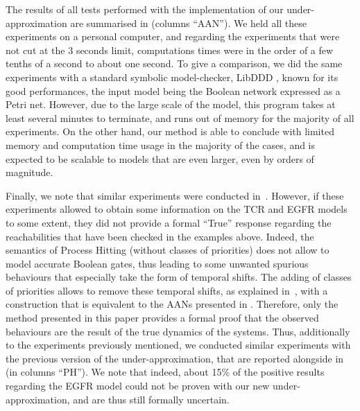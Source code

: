 The results of all tests performed with the implementation of our under-approximation
are summarised in  (columns “AAN”).
We held all these experiments on a personal computer,
and regarding the experiments that were not cut at the 3 seconds limit,
computations times were in the order of a few tenths of a second to about one second.
To give a comparison, we did the same experiments with a standard symbolic model-checker, LibDDD
\cite{libddd}, known for its good performances, the input model being the Boolean network expressed
as a Petri net.
However, due to the large scale of the model,
this program takes at least several minutes to terminate,
and runs out of memory for the majority of all experiments.
On the other hand,
our method is able to conclude with limited memory and computation time usage
in the majority of the cases,
and is expected to be scalable to models that are even larger,
even by orders of magnitude.

Finally, we note that similar experiments were conducted in~\cite{PMR12-MSCS}.
However, if these experiments allowed to obtain some information
on the TCR and EGFR models to some extent,
they did not provide a formal “True” response regarding the reachabilities that have been
checked in the examples above.
Indeed, the semantics of Process Hitting (without classes of priorities)
does not allow to model accurate Boolean gates,
thus leading to some unwanted spurious behaviours
that especially take the form of temporal shifts.
The adding of classes of priorities allows to remove these temporal shifts,
as explained in~\cite{FPMR13-CS2Bio},
with a construction that is equivalent to the AANs presented in .
Therefore, only the method presented in this paper provides a formal proof that
the observed behaviours are the result of the true dynamics of the systems.
Thus, additionally to the experiments previously mentioned,
we conducted similar experiments with the previous version
of the under-approximation, that are reported alongside in 
(in columns “PH”).
We note that indeed, about 15\% of the positive results regarding the EGFR model
could not be proven with our new under-approximation,
and are thus still formally uncertain.

\newcommand{\grcl}{\cellcolor{lightgraycell}}

